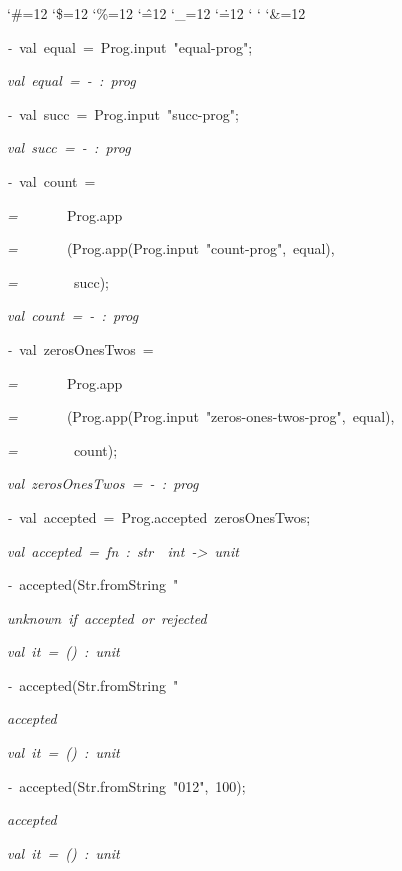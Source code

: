 \begin{list}{}
{\setlength{\leftmargin}{\leftmargini}
\setlength{\rightmargin}{0cm}
\setlength{\itemindent}{0cm}
\setlength{\listparindent}{0cm}
\setlength{\itemsep}{0cm}
\setlength{\parsep}{0cm}
\setlength{\labelsep}{0cm}
\setlength{\labelwidth}{0cm}
\catcode`\#=12
\catcode`\$=12
\catcode`\%=12
\catcode`\^=12
\catcode`\_=12
\catcode`\.=12
\catcode`
\catcode`
\catcode`\&=12
\ttfamily}
\small
\item[]\textsl{-\ }val\ equal\ =\ Prog.input\ "equal-prog";
\item[]\textsl{val\ equal\ =\ -\ :\ prog}
\item[]\textsl{-\ }val\ succ\ =\ Prog.input\ "succ-prog";
\item[]\textsl{val\ succ\ =\ -\ :\ prog}
\item[]\textsl{-\ }val\ count\ =
\item[]\textsl{=\ }\ \ \ \ \ \ Prog.app
\item[]\textsl{=\ }\ \ \ \ \ \ (Prog.app(Prog.input\ "count-prog",\ equal),
\item[]\textsl{=\ }\ \ \ \ \ \ \ succ);
\item[]\textsl{val\ count\ =\ -\ :\ prog}
\item[]\textsl{-\ }val\ zerosOnesTwos\ =
\item[]\textsl{=\ }\ \ \ \ \ \ Prog.app
\item[]\textsl{=\ }\ \ \ \ \ \ (Prog.app(Prog.input\ "zeros-ones-twos-prog",\ equal),
\item[]\textsl{=\ }\ \ \ \ \ \ \ count);
\item[]\textsl{val\ zerosOnesTwos\ =\ -\ :\ prog}
\item[]\textsl{-\ }val\ accepted\ =\ Prog.accepted\ zerosOnesTwos;
\item[]\textsl{val\ accepted\ =\ fn\ :\ str\ \ int\ ->\ unit}
\item[]\textsl{-\ }accepted(Str.fromString\ "%
\item[]\textsl{unknown\ if\ accepted\ or\ rejected}
\item[]\textsl{val\ it\ =\ ()\ :\ unit}
\item[]\textsl{-\ }accepted(Str.fromString\ "%
\item[]\textsl{accepted}
\item[]\textsl{val\ it\ =\ ()\ :\ unit}
\item[]\textsl{-\ }accepted(Str.fromString\ "012",\ 100);
\item[]\textsl{accepted}
\item[]\textsl{val\ it\ =\ ()\ :\ unit}

\end{list}

